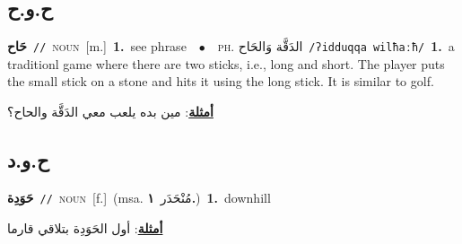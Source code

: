 \documentclass[10pt,a4paper,twoside]{article} %
\begin{document}
\begin{multicols}{2}
\vspace{-3mm}
\subsection*{\color{blue}\foreignlanguage{arabic}{ح.و.ح}\color{blue}{ (ntws)}} 

{\setlength\topsep{0pt}\textbf{\foreignlanguage{arabic}{حَاح}}\ {\color{gray}\texttt{//}\color{black}}\ \textsc{noun}\ [m.]\ \textbf{1.}~see phrase\ \ $\bullet$\ \ \textsc{ph.} \color{gray} \foreignlanguage{arabic}{الدَقَّة وَالحَاح}\color{black}\ {\color{gray}\texttt{/{\sffamily ʔidduqqa wilħaːħ}/}\color{black}}\ \textbf{1.}~a traditionl game where there are two sticks, i.e., long and short. The player puts the small stick on a stone and hits it using the long stick. It is similar to golf.\  \begin{flushright}\color{gray}\foreignlanguage{arabic}{\textbf{\underline{\foreignlanguage{arabic}{أمثلة}}}: مين بده يلعب معي الدَقَّة والحاح؟}\end{flushright}\color{black}} \vspace{2mm}

\vspace{-3mm}
\subsection*{\color{blue}\foreignlanguage{arabic}{ح.و.د}\color{blue}{}} 

{\setlength\topsep{0pt}\textbf{\foreignlanguage{arabic}{حَوَدِة}}\ {\color{gray}\texttt{//}\color{black}}\ \textsc{noun}\ [f.]\ \color{gray}(msa. \foreignlanguage{arabic}{مُنْحَدَر}~\foreignlanguage{arabic}{\textbf{١.}})\color{black}\ \textbf{1.}~downhill\  \begin{flushright}\color{gray}\foreignlanguage{arabic}{\textbf{\underline{\foreignlanguage{arabic}{أمثلة}}}: أول الحَوَدِة بتلاقي قارما}\end{flushright}\color{black}} \vspace{2mm}


\end{multicols}
\end{document}
